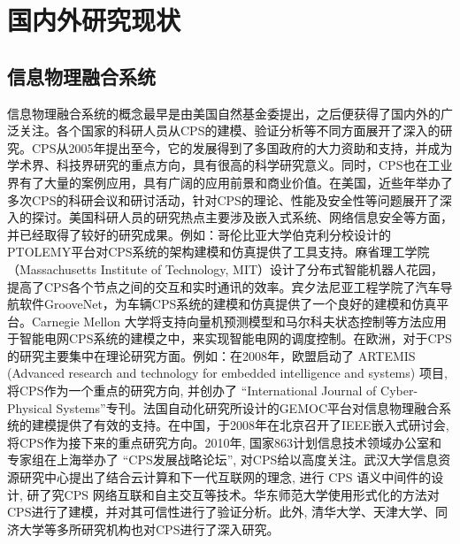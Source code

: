 \section{国内外研究现状}

\subsection{信息物理融合系统}
信息物理融合系统的概念最早是由美国自然基金委提出，之后便获得了国内外的广泛关注。各个国家的科研人员从CPS的建模、验证分析等不同方面展开了深入的研究。CPS从2005年提出至今，它的发展得到了多国政府的大力资助和支持，并成为学术界、科技界研究的重点方向，具有很高的科学研究意义。同时，CPS也在工业界有了大量的案例应用，具有广阔的应用前景和商业价值。在美国，近些年举办了多次CPS的科研会议和研讨活动，针对CPS的理论、性能及安全性等问题展开了深入的探讨。美国科研人员的研究热点主要涉及嵌入式系统、网络信息安全等方面，并已经取得了较好的研究成果。例如：哥伦比亚大学伯克利分校设计的PTOLEMY平台对CPS系统的架构建模和仿真提供了工具支持。麻省理工学院 （Massachusetts Institute of Technology, MIT）设计了分布式智能机器人花园，提高了CPS各个节点之间的交互和实时通讯的效率。宾夕法尼亚工程学院了汽车导航软件GrooveNet，为车辆CPS系统的建模和仿真提供了一个良好的建模和仿真平台。Carnegie Mellon 大学将支持向量机预测模型和马尔科夫状态控制等方法应用于智能电网CPS系统的建模之中，来实现智能电网的调度控制。在欧洲，对于CPS的研究主要集中在理论研究方面。例如：在2008年，欧盟启动了 ARTEMIS (Advanced research and technology for embedded intelligence and systems) 项目, 将CPS作为一个重点的研究方向, 并创办了 “International Journal of Cyber-Physical Systems”专刊。法国自动化研究所设计的GEMOC平台对信息物理融合系统的建模提供了有效的支持。在中国，于2008年在北京召开了IEEE嵌入式研讨会, 将CPS作为接下来的重点研究方向。2010年, 国家863计划信息技术领域办公室和专家组在上海举办了 “CPS发展战略论坛”, 对CPS给以高度关注。武汉大学信息资源研究中心提出了结合云计算和下一代互联网的理念, 进行 CPS 语义中间件的设计, 研了究CPS 网络互联和自主交互等技术。华东师范大学使用形式化的方法对CPS进行了建模，并对其可信性进行了验证分析。此外, 清华大学、天津大学、同济大学等多所研究机构也对CPS进行了深入研究。

